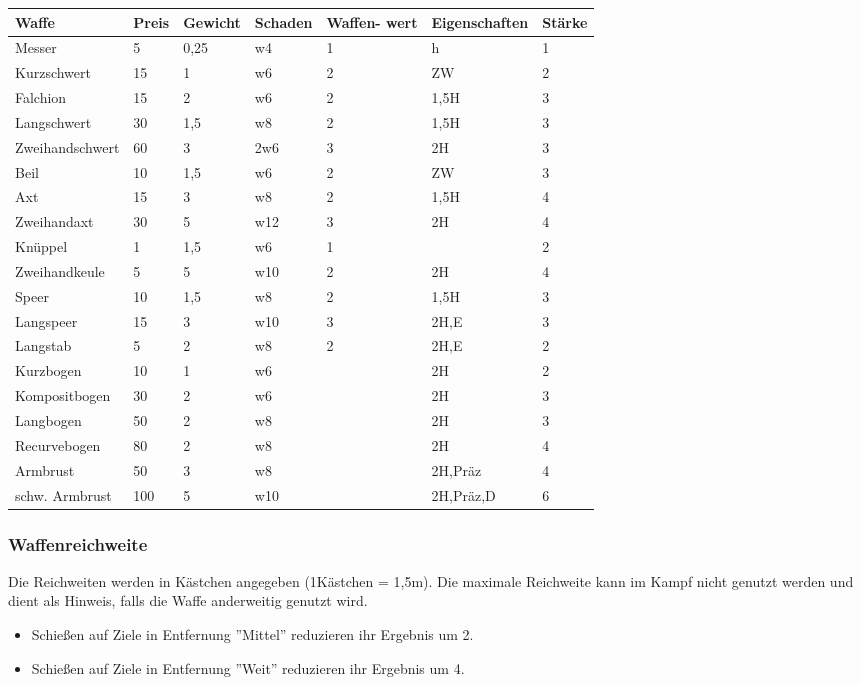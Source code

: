 \documentclass{article}
\begin{document}
\begin{small}
\begin{tabular}{|m{25mm}|m{1cm}|m{15mm}|m{15mm}|m{15mm}|m{25mm}|m{1cm}|}
\hline
\textbf{Waffe}&\textbf{Preis}&\textbf{Gewicht}&\textbf{Schaden}&\textbf{Waffen- wert}&\textbf{Eigenschaften}&\textbf{Stärke}\\
\hline
\hline
Messer&5&0,25&w4&1&h&1\\
\hline
Kurzschwert&15&1&w6&2&ZW&2\\
\hline
Falchion&15&2&w6&2&1,5H&3\\
\hline
Langschwert&30&1,5&w8&2&1,5H&3\\
\hline
Zweihandschwert&60&3&2w6&3&2H&3\\
\hline
Beil&10&1,5&w6&2&ZW&3\\
\hline
Axt&15&3&w8&2&1,5H&4\\
\hline
Zweihandaxt&30&5&w12&3&2H&4\\
\hline
Knüppel&1&1,5&w6&1& &2\\
\hline
Zweihandkeule&5&5&w10&2&2H&4\\
\hline
Speer&10&1,5&w8&2&1,5H&3\\
\hline
Langspeer&15&3&w10&3&2H,E&3\\
\hline
Langstab&5&2&w8&2&2H,E&2\\
\hline
Kurzbogen&10&1&w6& &2H&2\\
\hline
Kompositbogen&30&2&w6& &2H&3\\
\hline
Langbogen&50&2&w8& &2H&3\\
\hline
Recurvebogen&80&2&w8& &2H&4\\
\hline
Armbrust&50&3&w8& &2H,Präz&4\\
\hline
schw. Armbrust&100&5&w10& &2H,Präz,D&6\\
\hline
\end{tabular}
\end{small}

\subsubsection{Waffenreichweite}

Die Reichweiten werden in Kästchen angegeben (1Kästchen = 1,5m). Die maximale Reichweite kann im Kampf nicht genutzt
werden und dient als Hinweis, falls die Waffe anderweitig genutzt wird.

\begin{itemize}
\item Schießen auf Ziele in Entfernung ''Mittel'' reduzieren ihr Ergebnis um 2.
\item Schießen auf Ziele in Entfernung ''Weit'' reduzieren ihr Ergebnis um 4.
\end{itemize}
\end{document}
